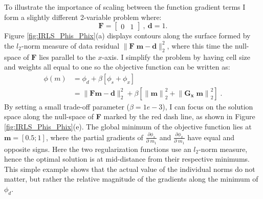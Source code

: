 To illustrate the importance of scaling between the function gradient terms I form a slightly different 2-variable problem where:
\begin{equation}
	\mathbf{F} = 
	\begin{bmatrix}
	0 & 1
	\end{bmatrix}\:,\:
	\mathbf{d} = 1 .
\end{equation}
Figure \ref{fig:IRLS_Phis_Phix}(a) displays contours along the surface formed by the $l_2$-norm measure of data residual $\|\mathbf{ F\;m - d }\|_2^2$, where this time the null-space of $\mathbf{F}$ lies parallel to the $x$-axis. 
I simplify the problem by having cell size and weights all equal to one so the objective function can be written as:
\begin{equation}\label{eq:Toy_phi}
\begin{split}
\phi(m) &= \phi_d + \beta \left[ \phi_s + \phi_x \right] \\
&= \|\mathbf{Fm - d}\|_2^2 + \beta \left [ {\| \mathbf{m}\|}^2_2 +  {\|  \mathbf{ G_\text{x} \; m}\|}^2_2  \right ] \;.
\end{split}
\end{equation}
By setting a small trade-off parameter ($\beta = 1e-3$), I can focus on the solution space along the null-space of \textbf{F} marked by the red dash line, as shown in Figure \ref{fig:IRLS_Phis_Phix}(e).
The global minimum of the objective function lies at $\mathbf{m} = [0.5;1]$, where the partial gradients of $\frac{\partial\phi_s}{\partial\;m_1}$ and $\frac{\partial\phi_x}{\partial\;m_1}$ have equal and opposite signs.
Here the two regularization functions use an $l_2$-norm measure, hence the optimal solution is at mid-distance from their respective minimums.
This simple example shows that the actual value of the individual norms do not matter, but rather the relative magnitude of the gradients along the  minimum of $\phi_d$.

